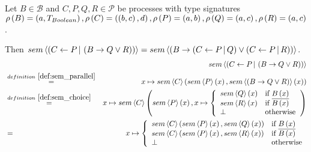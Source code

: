 \begin{myproof}
Let $B \in \mathcal{B}$ and $C, P, Q, R \in \mathcal{P}$ be processes with type signatures $\rho \left( B \right) = \left( a, T_{Boolean} \right), \rho \left( C \right) = \left( \left( b, c \right), d \right), \rho \left( P \right) = \left( a, b \right), \rho \left( Q \right) = \left( a, c \right), \rho \left( R \right) = \left( a, c \right)$.

Then $sem \left\langle \left( C \gets P \, | \, \left( B \to Q \vee R \right) \right) \right\rangle = sem \left\langle \left( B \to \left( C \gets P \, | \, Q \right) \vee \left( C \gets P \, | \, R \right) \right) \right\rangle$.
\begin{eqnarray*}
  &                                        & \sem{\parallel{C}{P}{\choice{B}{Q}{R}}} \\
  & \overset{\defref{def:sem_parallel}}{=} & x \mapsto \sem{C} \left( \sem{P} \left( x \right), \sem{\choice{B}{Q}{R}} \left( x \right) \right) \\
  & \overset{\defref{def:sem_choice}}{=}   & x \mapsto \sem{C} \left( \sem{P} \left( x \right), x \mapsto \left\{\begin{array}{ll}
                                                                                 \sem{Q} \left( x \right) & \text{if } B \left( x \right) \\
                                                                                 \sem{R} \left( x \right) & \text{if } \overline{B \left( x \right)} \\
                                                                                 \bot & \text{otherwise}
                                                                               \end{array}
                                                                        \right.\right) \\
  & =                                      & x \mapsto \left\{\begin{array}{ll}
                                                      \sem{C} \left( \sem{P} \left( x \right), \sem{Q} \left( x \right) \right) & \text{if } B \left( x \right) \\
                                                      \sem{C} \left( \sem{P} \left( x \right), \sem{R} \left( x \right) \right) & \text{if } \overline{B \left( x \right)} \\
                                                      \bot & \text{otherwise}
                                                    \end{array}
                                             \right. \\

\end{eqnarray*}
\end{myproof}
